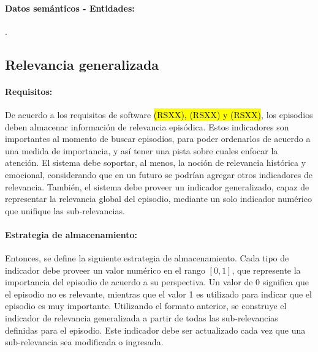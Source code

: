 

\paragraph{Datos semánticos - Entidades:}
.





\subsection{Relevancia generalizada}

\paragraph{Requisitos:}
De acuerdo a los requisitos de software \hl{(RSXX), (RSXX) y (RSXX)}, los episodios deben almacenar información de relevancia episódica. Estos indicadores son importantes al momento de buscar episodios, para poder ordenarlos de acuerdo a una medida de importancia, y así tener una pista sobre cuales enfocar la atención. El sistema debe soportar, al menos, la noción de relevancia histórica y emocional, considerando que en un futuro se podrían agregar otros indicadores de relevancia. También, el sistema debe proveer un indicador generalizado, capaz de representar la relevancia global del episodio, mediante un solo indicador numérico que unifique las sub-relevancias.


\paragraph{Estrategia de almacenamiento:}
Entonces, se define la siguiente estrategia de almacenamiento. Cada tipo de indicador debe proveer un valor numérico en el rango $[0, 1]$, que represente la importancia del episodio de acuerdo a su perspectiva. Un valor de 0 significa que el episodio no es relevante, mientras que el valor 1 es utilizado para indicar que el episodio es muy importante. Utilizando el formato anterior, se construye el indicador de relevancia generalizada a partir de todas las sub-relevancias definidas para el episodio. Este indicador debe ser actualizado cada vez que una sub-relevancia sea modificada o ingresada.


